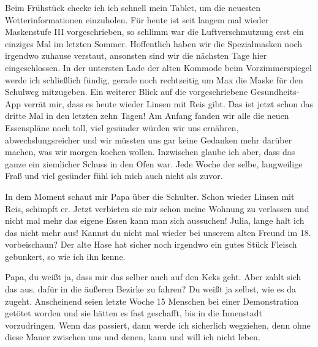 \documentclass[twoside, a4paper, DIV=11, open=any, bibliography=totoc]{scrbook}
\begin{document}
Beim Frühstück checke ich ich schnell mein Tablet, um die neuesten Wetterinformationen
einzuholen. Für heute ist seit langem mal wieder Maskenstufe III vorgeschrieben, 
so schlimm war die Luftverschmutzung erst ein einziges Mal im letzten Sommer.
Hoffentlich haben wir die Spezialmasken noch irgendwo zuhause verstaut,
ansonsten sind wir die nächsten Tage hier eingeschlossen. In der untersten Lade
der alten Kommode beim Vorzimmerspiegel werde ich schließlich fündig, gerade noch
rechtzeitig um Max die Maske für den Schulweg mitzugeben.
Ein weiterer Blick auf die vorgeschriebene Gesundheits-App verrät mir, dass
es heute wieder Linsen mit Reis gibt. Das ist jetzt schon das dritte Mal in den
letzten zehn Tagen! Am Anfang fanden wir alle die neuen Essenspläne noch toll,
viel gesünder würden wir uns ernähren, abwechslungsreicher und wir müssten uns
gar keine Gedanken mehr darüber machen, was wir morgen kochen wollen.
Inzwischen glaube ich aber, dass das ganze ein ziemlicher Schuss in den Ofen war.
Jede Woche der selbe, langweilige Fraß und viel gesünder 
fühl ich mich auch nicht als zuvor.

In dem Moment schaut mir Papa über die Schulter.
Schon wieder Linsen mit Reis, schimpft er. Jetzt verbieten sie mir schon meine
Wohnung zu verlassen und nicht mal mehr das eigene Essen kann man sich aussuchen!
Julia, lange halt ich das nicht mehr aus! Kannst du nicht mal wieder bei unserem
alten Freund im 18. vorbeischaun? Der alte Hase hat sicher noch irgendwo ein
gutes Stück Fleisch gebunkert, so wie ich ihn kenne.

Papa, du weißt ja, dass mir das selber auch auf den Keks geht. Aber zahlt sich
das aus, dafür in die äußeren Bezirke zu fahren? Du weißt ja selbst, wie es
da zugeht. Anscheinend seien letzte Woche 15 Menschen bei einer
Demonstration getötet worden und sie hätten es fast geschafft, bis in die
Innenstadt vorzudringen. Wenn das
passiert, dann werde ich sicherlich wegziehen, denn ohne diese Mauer zwischen uns
und denen, kann und will ich
nicht leben. 
\end{document}
